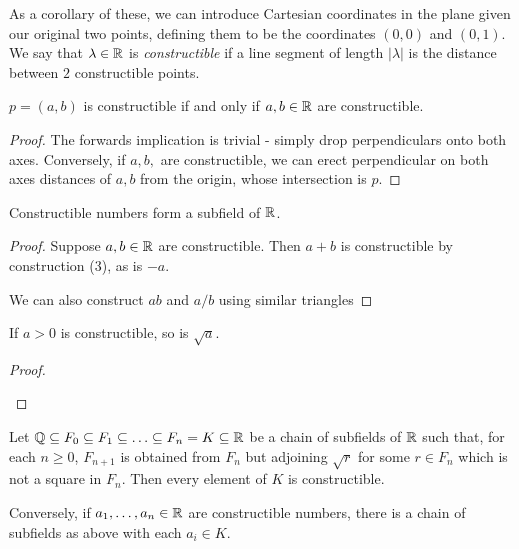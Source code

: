 \documentclass[10pt,a4paper]{article}
\begin{document}
\newpage
As a corollary of these, we can introduce Cartesian coordinates in the plane given our original two points, defining them to be the coordinates $(0,0)$ and $(0,1)$. We say that $\lambda\in\mathbb{R}$ is \emph{constructible} if a line segment of length $|\lambda|$ is the distance between $2$ constructible points.
\begin{lemma}
$p=(a,b)$ is constructible if and only if $a,b \in \mathbb{R}$ are constructible.
\end{lemma}
\begin{proof}
The forwards implication is trivial - simply drop perpendiculars onto both axes. Conversely, if $a,b,$ are constructible, we can erect perpendicular on both axes distances of $a, b$ from the origin, whose intersection is $p$.
\end{proof}
\begin{proposition}
Constructible numbers form a subfield of $\mathbb{R}$.
\end{proposition}
\begin{proof}
Suppose $a,b \in \mathbb{R}$ are constructible. Then $a+b$ is constructible by construction (3), as is $-a$.

We can also construct $ab$ and $a/b$ using similar triangles %
\end{proof}

\begin{proposition}
If $a>0$ is constructible, so is $\sqrt{a}$.
\end{proposition}
\begin{proof}
\item
\begin{center}
\end{center}
\end{proof}

\begin{corollary}
Let $\mathbb{Q} \subseteq F_0 \subseteq F_1 \subseteq \ldots \subseteq F_n = K \subseteq \mathbb{R}$ be a chain of subfields of $\mathbb{R}$ such that, for each $n\geq 0$, $F_{n+1}$ is obtained from $F_n$ but adjoining $\sqrt{r}$ for some $r \in F_n$ which is not a square in $F_n$. Then every element of $K$ is constructible.

Conversely, if $a_1, \ldots, a_n \in \mathbb{R}$ are constructible numbers, there is a chain of subfields as above with each $a_i \in K$.
\end{corollary}
\end{document}
